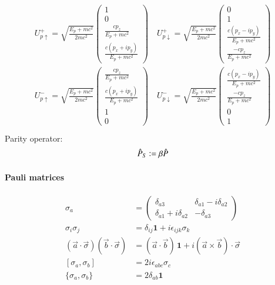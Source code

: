 \begin{align}
	\begin{split}
	U_{p \uparrow}^{+} = \sqrt{\frac{E_p + mc^2}{2mc^2}} \begin{pmatrix} 1 \\ 0 \\ \frac{cp_z}{E_p + mc^2} \\ \frac{c(p_x + ip_y)}{E_p + mc^2}\end{pmatrix}	\quad
	U_{p \downarrow}^{+} = \sqrt{\frac{E_p + mc^2}{2mc^2}} \begin{pmatrix}  0 \\ 1 \\ \frac{c(p_x - ip_y)}{E_p + mc^2}\\  \frac{-cp_z}{E_p + mc^2}\end{pmatrix}	\\
	U_{p \uparrow}^{-} = \sqrt{\frac{E_p + mc^2}{2mc^2}} \begin{pmatrix} \frac{cp_z}{E_p + mc^2} \\ \frac{c(p_x + ip_y)}{E_p + mc^2} \\ 1 \\ 0 \end{pmatrix}	\quad
	U_{p \downarrow}^{-} = \sqrt{\frac{E_p + mc^2}{2mc^2}} \begin{pmatrix}  \frac{c(p_x - ip_y)}{E_p + mc^2}\\  \frac{-cp_z}{E_p + mc^2} \\ 0 \\ 1 \end{pmatrix}	\\
	\end{split}
\end{align}
Parity operator:
\begin{align}
	\hat{P}_S \vcentcolon = \beta \hat{P}
\end{align}
\paragraph{Pauli matrices}
\begin{align}
	\sigma_a &= 
    \begin{pmatrix}
      \delta_{a3}                &  \delta_{a1} - i\delta_{a2}\\
      \delta_{a1} + i\delta_{a2} & -\delta_{a3}
    \end{pmatrix} \\
	\sigma_i \sigma_j &= \delta_{ij}\mathbf{1} + i \epsilon_{ijk}\sigma_k \\
	(\vec{a} \cdot \vec{\sigma})(\vec{b} \cdot \vec{\sigma}) &= (\vec{a} \cdot \vec{b}) \, \mathbf{1} + i ( \vec{a} \times \vec{b} )\cdot \vec{\sigma} \\
	[ \sigma_a, \sigma_b ] &= 2 i \epsilon_{abc}\sigma_c \\
	\{\sigma_a, \sigma_b\} &= 2\delta_{ab}\mathbf{1} \\
\end{align}

